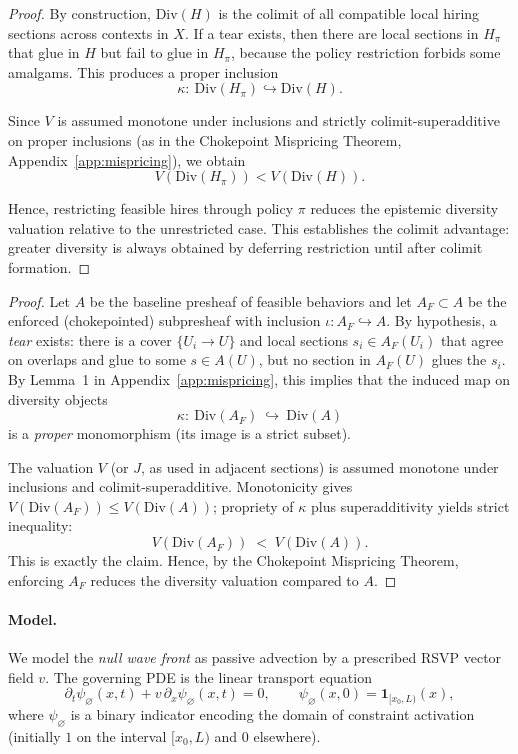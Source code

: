 \documentclass[12pt]{article}
\theoremstyle{remark}
\begin{document}
\begin{proof}
By construction, $\mathrm{Div}(H)$ is the colimit of all compatible local hiring sections across contexts in $X$. 
If a tear exists, then there are local sections in $H_\pi$ that glue in $H$ but fail to glue in $H_\pi$, because the policy restriction forbids some amalgams. 
This produces a proper inclusion
\[
\kappa:\ \mathrm{Div}(H_\pi) \hookrightarrow \mathrm{Div}(H).
\]

Since $V$ is assumed monotone under inclusions and strictly colimit-superadditive on proper inclusions (as in the Chokepoint Mispricing Theorem, Appendix~\ref{app:mispricing}), we obtain
\[
V(\mathrm{Div}(H_\pi)) < V(\mathrm{Div}(H)).
\]

Hence, restricting feasible hires through policy $\pi$ reduces the epistemic diversity valuation relative to the unrestricted case. 
This establishes the colimit advantage: greater diversity is always obtained by deferring restriction until after colimit formation.
\end{proof}


\begin{proof}
Let $A$ be the baseline presheaf of feasible behaviors and let $A_F\subset A$ be the enforced (chokepointed) subpresheaf with inclusion $\iota:A_F\hookrightarrow A$.
By hypothesis, a \emph{tear} exists: there is a cover $\{U_i\to U\}$ and local sections
$s_i\in A_F(U_i)$ that agree on overlaps and glue to some $s\in A(U)$, but no section in $A_F(U)$ glues the $s_i$.
By Lemma~1 in Appendix~\ref{app:mispricing}, this implies that the induced map on diversity objects
\[
\kappa:\ \mathrm{Div}(A_F)\ \hookrightarrow\ \mathrm{Div}(A)
\]
is a \emph{proper} monomorphism (its image is a strict subset).

The valuation $V$ (or $J$, as used in adjacent sections) is assumed monotone under inclusions and colimit-superadditive.
Monotonicity gives $V(\mathrm{Div}(A_F))\le V(\mathrm{Div}(A))$; propriety of $\kappa$ plus superadditivity yields strict inequality:
\[
V(\mathrm{Div}(A_F))\;<\;V(\mathrm{Div}(A)).
\]
This is exactly the claim. Hence, by the Chokepoint Mispricing Theorem, enforcing $A_F$ reduces the diversity valuation compared to $A$.
\end{proof}

\paragraph{Model.}
We model the \emph{null wave front} as passive advection by a prescribed RSVP vector field $v$. 
The governing PDE is the linear transport equation
\[
\partial_t \psi_{\varnothing}(x,t) + v\,\partial_x \psi_{\varnothing}(x,t) = 0,
\qquad 
\psi_{\varnothing}(x,0) = \mathbf{1}_{[x_0,L)}(x),
\]
where $\psi_{\varnothing}$ is a binary indicator encoding the domain of constraint activation 
(initially $1$ on the interval $[x_0,L)$ and $0$ elsewhere).
\end{document}
